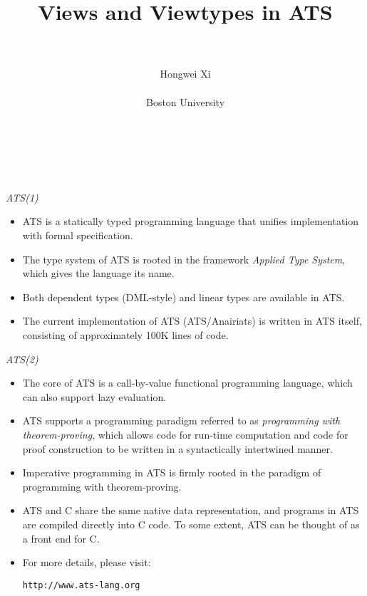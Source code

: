 \documentclass[pdf]{prosper}
\title{\huge\bf Views and Viewtypes in ATS}
\author{~\\~\\
{\large Hongwei Xi} \\~\\
{\large Boston University} \\~\\~\\~\\
\institution{Work partly funded by NSF}}
\begin{document}
\maketitle
\begin{slide}{\em ATS(1)}
\begin{itemize}
\item
ATS is a statically typed programming language that unifies implementation
with formal specification.
\item
The type system of ATS is rooted in the framework {\em Applied Type System},
which gives the language its name.
\item
Both dependent types (DML-style) and linear types are available in ATS.
\item
The current implementation of ATS (ATS/Anairiats) is written in ATS itself,
consisting of approximately 100K lines of code.
\end{itemize}
\end{slide}
\begin{slide}{\em ATS(2)}
\begin{itemize}
\item
The core of ATS is a call-by-value functional programming language, which
can also support lazy evaluation.
\item
ATS supports a programming paradigm referred to as {\em programming with
theorem-proving}, which allows code for run-time computation and code for
proof construction to be written in a syntactically intertwined manner.
\item Imperative programming in ATS is firmly rooted in the paradigm of
programming with theorem-proving.
\item ATS and C share the same native data representation, and
programs in ATS are compiled directly into C code. To some extent, ATS
can be thought of as a front end for C.
\item For more details, please visit:
\begin{center}
\texttt{http://www.ats-lang.org}
\end{center}
\end{itemize}
\end{slide}
\def\ATS{\mbox{$\cal A\kern-1.5pt T\kern-3pt S$}}
\end{document}
